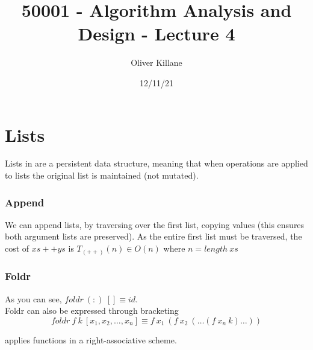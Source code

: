 \documentclass{report}
\title{50001 - Algorithm Analysis and Design - Lecture 4}
\author{Oliver Killane}
\date{12/11/21}
\begin{document}
    \maketitle

    \section*{Lists}
        Lists in  are a persistent data structure, meaning that when operations are applied to lists the original list is maintained (not mutated).

        \subsubsection*{Append}
            We can append lists, by traversing over the first list, copying values (this ensures both argument lists are preserved).
            As the entire first list must be traversed, the cost of $xs ++ ys$ is $T_{(++)}(n) \in O(n)$ where $n = length \ xs$
        
        \subsubsection*{Foldr}
            As you can see, $foldr \ (:) \ [] \equiv id$.
            \\ Foldr can also be expressed through bracketing
            \[foldr \ f \ k \ [x_1, x_2, \dots, x_n] \equiv f \ x_1 \ (f \ x_2 \ ( \dots (f \ x_n \ k) \dots))\]

             applies functions in a right-associative scheme.
        
\end{document}
